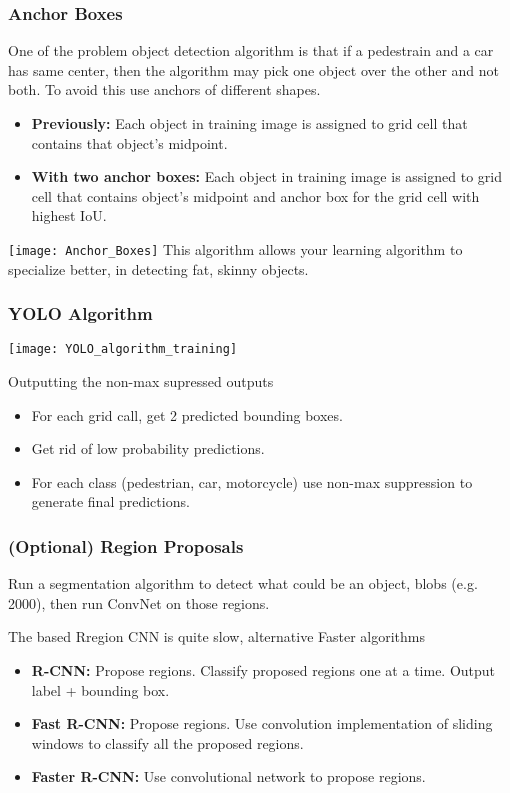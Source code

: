 \subsubsection{Anchor Boxes}
One of the problem object detection algorithm is that if a pedestrain and a car has same center, then the algorithm may pick one object over the other and not both. To avoid this use anchors of different shapes.

\begin{itemize}
    \item \textbf{Previously:} Each object in training image is assigned to grid cell that contains that object’s midpoint.
    \item \textbf{With two anchor boxes:} Each object in training image is assigned to grid cell that contains object’s midpoint and anchor box for the grid cell with highest IoU.
\end{itemize}
\texttt{[image: Anchor\_Boxes]}
This algorithm allows your learning algorithm to specialize better, in detecting fat, skinny objects.

\subsubsection{YOLO Algorithm}
\texttt{[image: YOLO\_algorithm\_training]}

Outputting the non-max supressed outputs
\begin{itemize}
    \item For each grid call, get 2 predicted bounding boxes. 
    \item Get rid of low probability predictions.
    \item For each class (pedestrian, car, motorcycle) use non-max suppression to generate final predictions.
\end{itemize}

\subsubsection{(Optional) Region Proposals}
Run a segmentation algorithm to detect what could be an object, blobs (e.g. 2000), then run ConvNet on those regions.

The based Rregion CNN is quite slow, alternative Faster algorithms
\begin{itemize}
    \item \textbf{R-CNN:} Propose regions. Classify proposed regions one at a time. Output label + bounding box.
    \item \textbf{Fast R-CNN:} Propose regions. Use convolution implementation of sliding windows to classify all the proposed regions.
    \item \textbf{Faster R-CNN:} Use convolutional network to propose regions.
\end{itemize}

